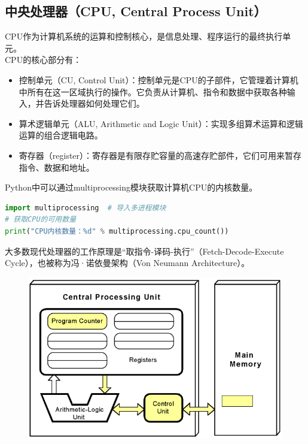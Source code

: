 \subsection{中央处理器（CPU, Central Process Unit）}

CPU作为计算机系统的运算和控制核心，是信息处理、程序运行的最终执行单元。\\

CPU的核心部分有：

\begin{itemize}
	\item 控制单元（CU, Control Unit）：控制单元是CPU的子部件，它管理着计算机中所有在这一区域执行的操作。它负责从计算机、指令和数据中获取各种输入，并告诉处理器如何处理它们。

	\item 算术逻辑单元（ALU, Arithmetic and Logic Unit）：实现多组算术运算和逻辑运算的组合逻辑电路。

	\item 寄存器（register）：寄存器是有限存贮容量的高速存贮部件，它们可用来暂存指令、数据和地址。
\end{itemize}

Python中可以通过multiprocessing模块获取计算机CPU的内核数量。\\


\begin{lstlisting}[language=Python]
import multiprocessing	# 导入多进程模块
# 获取CPU的可用数量
print("CPU内核数量：%d" % multiprocessing.cpu_count())
\end{lstlisting}

大多数现代处理器的工作原理是“取指令-译码-执行”（Fetch-Decode-Execute Cycle），也被称为冯·诺依曼架构（Von Neumann Architecture）。

\begin{figure}[H]
	\centering
	\includegraphics[scale=0.5]{img/C1/1-3/1.png}
\end{figure}

